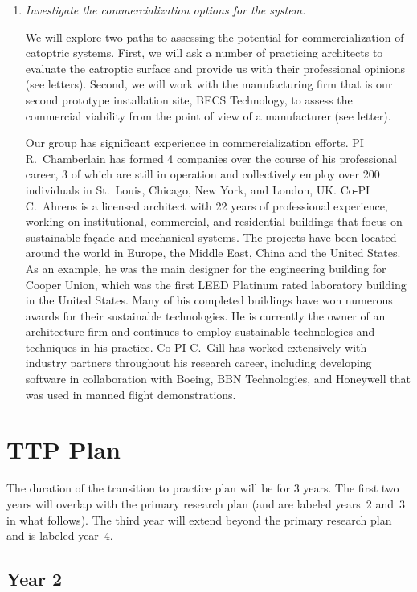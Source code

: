 \documentclass[11pt]{article}
\begin{document}
\begin{enumerate}
\item \emph{Investigate the commercialization options for the system.}

We will explore two paths to assessing the potential for commercialization
of catoptric systems.
First, we will ask a number of practicing architects to evaluate the
catroptic surface and provide us with their professional opinions
(see letters).
Second, we will work with the manufacturing firm that is our second
prototype installation site, BECS Technology, to assess the commercial
viability from the point of view of a manufacturer (see letter).

Our group has significant experience in commercialization efforts.
PI R.~Chamberlain has formed 4 companies over the course of his professional
career, 3 of which are still in operation and collectively employ
over 200 individuals in St.~Louis, Chicago, New York, and London, UK.
Co-PI C.~Ahrens is a licensed architect with 22 years of professional
experience, working on institutional, commercial, and residential
buildings that focus on sustainable fa\c{c}ade and mechanical systems.
The projects have been located around the world in Europe, the Middle East,
China and the United States. As an example, he was the main designer for
the engineering building for Cooper Union, which was the first
LEED Platinum rated laboratory building in the United States.
Many of his completed buildings have won numerous awards for their
sustainable technologies.
He is currently the owner of an architecture firm and continues
to employ sustainable technologies and techniques in his practice.  
Co-PI C.~Gill has worked extensively with industry partners throughout his
research career, including developing software in collaboration with Boeing, 
BBN Technologies, and Honeywell that was used in manned flight demonstrations.

\end{enumerate}

\section{TTP Plan}

The duration of the transition to practice plan will be for 3 years.
The first two years will overlap with the primary research plan (and
are labeled years~2 and~3 in what follows).  The third year will extend
beyond the primary research plan and is labeled year~4.

\subsection*{Year 2}
\end{document}
